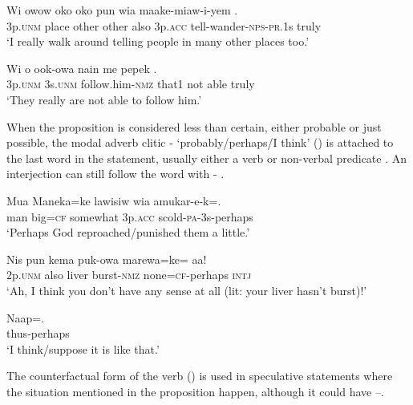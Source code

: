 \ea%
\label{ex:6:x1050}
\gll Wi  owow  oko  oko  pun  wia  maake-miaw-i-yem . \\
3p.\textsc{unm}  place  other  other  also  3p.\textsc{acc}  tell-wander-\textsc{nps}-\textsc{pr}.1s truly\\
\glt `I really walk around telling people in many other places too.'
\z

\ea%
\label{ex:6:x1051}
\gll Wi  o  ook-owa  nain  me  pepek  . \\
3p.\textsc{unm}  3s.\textsc{unm}  follow.him-\textsc{nmz}  that1  not  able  truly\\
\glt `They really are not able to follow him.'
\z

When the proposition is considered less than certain, either probable or just possible, the modal adverb clitic - `probably/perhaps/I think' () is attached to the last word in the statement, usually either a verb  or non-verbal predicate . An interjection can still follow the word with - .

\ea%
\label{ex:6:x1052}
\gll Mua  Maneka=ke  lawisiw  wia  amukar-e-k=. \\
man  big=\textsc{cf}  somewhat  3p.\textsc{acc}  scold-\textsc{pa}-3s-perhaps\\
\glt `Perhaps God reproached/punished them a little.'
\z

\ea%
\label{ex:6:x1053}
\gll Nis  pun  kema  puk-owa  marewa=ke=  aa! \\
2p.\textsc{unm}  also  liver  burst-\textsc{nmz}  none=\textsc{cf}-perhaps  \textsc{intj}\\
\glt `Ah, I think you don't have any sense at all (lit: your liver hasn't burst)!'
\z

\ea%
\label{ex:6:x1071}
\gll Naap=. \\
thus-perhaps\\
\glt `I think/suppose it is like that.'
\z

The counterfactual form of the verb () is used in speculative statements where the situation mentioned in the proposition  happen, although it could have --. 

